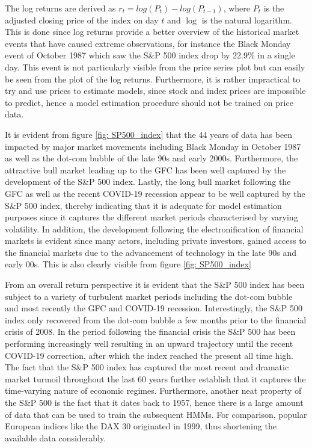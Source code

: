 The log returns are derived as $r_t = log(P_t) - log(P_{t-1})$, where $P_t$ is the adjusted closing price of the index on day $t$ and $\log$ is the natural logarithm. This is done since log returns provide a better overview of the historical market events that have caused extreme observations, for instance the Black Monday event of October 1987 which saw the S\&P 500 index drop by 22.9\% in a single day. This event is not particularly visible from the price series plot but can easily be seen from the plot of the log returns. Furthermore, it is rather impractical to try and use prices to estimate models, since stock and index prices are impossible to predict, hence a model estimation procedure should not be trained on price data.

It is evident from figure \ref{fig: SP500_index} that the 44 years of data has been impacted by major market movements including Black Monday in October 1987 as well as the dot-com bubble of the late 90s and early 2000s. Furthermore, the attractive bull market leading up to the GFC has been well captured by the development of the S\&P 500 index. Lastly, the long bull market following the GFC as well as the recent COVID-19 recession appear to be well captured by the S\&P 500 index, thereby indicating that it is adequate for model estimation purposes since it captures the different market periods characterised by varying volatility. In addition, the development following the electronification of financial markets is evident since many actors, including private investors, gained access to the financial markets due to the advancement of technology in the late 90s and early 00s. This is also clearly visible from figure \ref{fig: SP500_index}


From an overall return perspective it is evident that the S\&P 500 index has been subject to a variety of turbulent market periods including the dot-com bubble and most recently the GFC and COVID-19 recession. Interestingly, the S\&P 500 index only recovered from the dot-com bubble a few months prior to the financial crisis of 2008. In the period following the financial crisis the S\&P 500 has been performing increasingly well resulting in an upward trajectory until the recent COVID-19 correction, after which the index reached the present all time high. The fact that the S\&P 500 index has captured the most recent and dramatic market turmoil throughout the last 60 years further establish that it captures the time-varying nature of economic regimes. Furthermore, another neat property of the S\&P 500 is the fact that it dates back to 1957, hence there is a large amount of data that can be used to train the subsequent HMMs. For comparison, popular European indices like the DAX 30 originated in 1999, thus shortening the available data considerably.

